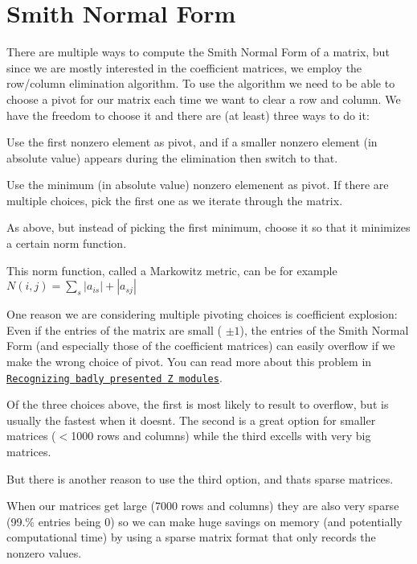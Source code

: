 \hypertarget{algo_smith}{}\section{Smith Normal Form}\label{algo_smith}
There are multiple ways to compute the Smith Normal Form of a matrix, but since we are mostly interested in the coefficient matrices, we employ the row/column elimination algorithm. To use the algorithm we need to be able to choose a pivot for our matrix each time we want to clear a row and column. We have the freedom to choose it and there are (at least) three ways to do it\+:


\begin{DoxyItemize}
\item Use the first nonzero element as pivot, and if a smaller nonzero element (in absolute value) appears during the elimination then switch to that.
\item Use the minimum (in absolute value) nonzero elemenent as pivot. If there are multiple choices, pick the first one as we iterate through the matrix.
\item As above, but instead of picking the first minimum, choose it so that it minimizes a certain norm function.
\end{DoxyItemize}

This norm function, called a Markowitz metric, can be for example $N(i,j)=\sum_s|a_{is}|+|a_{sj}|$

One reason we are considering multiple pivoting choices is coefficient explosion\+: Even if the entries of the matrix are small ( $\pm 1$), the entries of the Smith Normal Form (and especially those of the coefficient matrices) can easily overflow if we make the wrong choice of pivot. You can read more about this problem in \href{https://arxiv.org/abs/math/9406205}{\tt Recognizing badly presented Z modules}.

Of the three choices above, the first is most likely to result to overflow, but is usually the fastest when it doesn\textquotesingle{}t. The second is a great option for smaller matrices ($<$1000 rows and columns) while the third excells with very big matrices.

But there is another reason to use the third option, and that\textquotesingle{}s sparse matrices.

When our matrices get large (7000 rows and columns) they are also very sparse (99.\% entries being 0) so we can make huge savings on memory (and potentially computational time) by using a sparse matrix format that only records the nonzero values.

